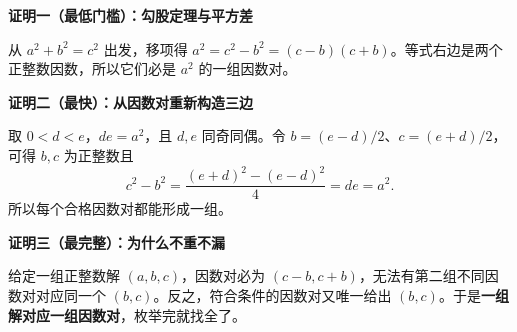 \clearpage
\begin{proofbox}
\textbf{\textcolor{CProof}{证明一（最低门槛）：勾股定理与平方差}}
\par\medskip
\begin{center}

\end{center}
\medskip
从 $a^2+b^2=c^2$ 出发，移项得 $a^2=c^2-b^2=(c-b)(c+b)$。等式右边是两个正整数因数，所以它们必是 $a^2$ 的一组因数对。
\end{proofbox}
\clearpage
\begin{proofbox}
\textbf{\textcolor{CProof}{证明二（最快）：从因数对重新构造三边}}
\par\medskip
\begin{center}

\end{center}
\medskip
取 $0<d<e$，$de=a^2$，且 $d,e$ 同奇同偶。令 $b=(e-d)/2$、$c=(e+d)/2$，可得 $b,c$ 为正整数且\[c^2-b^2=\frac{(e+d)^2-(e-d)^2}{4}=de=a^2.\]所以每个合格因数对都能形成一组。
\end{proofbox}
\clearpage
\begin{proofbox}
\textbf{\textcolor{CProof}{证明三（最完整）：为什么不重不漏}}
\par\medskip
\begin{center}

\end{center}
\medskip
给定一组正整数解 $(a,b,c)$，因数对必为 $(c-b,c+b)$，无法有第二组不同因数对对应同一个 $(b,c)$。反之，符合条件的因数对又唯一给出 $(b,c)$。于是\textbf{一组解对应一组因数对}，枚举完就找全了。
\end{proofbox}
